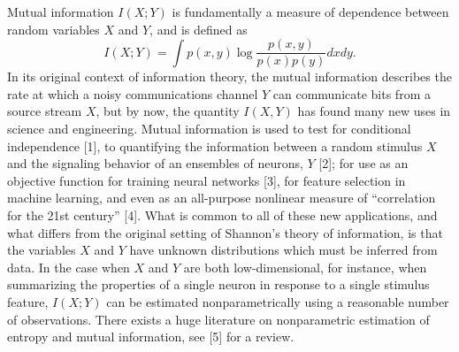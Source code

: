 \documentclass{article}
\begin{document}
Mutual information $I(X; Y)$ is fundamentally a measure of dependence
between random variables $X$ and $Y$, and is defined as
\[
I(X;Y) = \int p(x, y) \log \frac{p(x, y)}{p(x)p(y)}dxdy.
\]
In its original context of information theory, the mutual information
describes the rate at which a noisy communications channel $Y$ can
communicate bits from a source stream $X$, but by now, the quantity
$I(X, Y)$ has found many new uses in science and engineering.  Mutual
information is used to test for conditional independence [1], to
quantifying the information between a random stimulus $X$ and the
signaling behavior of an ensembles of neurons, $Y$ [2]; for
use as an objective function for training neural networks [3], for
feature selection in machine learning, and even as an all-purpose
nonlinear measure of ``correlation for the 21st century'' [4].
What is common to all of these new applications, and what differs from
the original setting of Shannon's theory of information, is that the
variables $X$ and $Y$ have unknown distributions which must be
inferred from data.  In the case when $X$ and $Y$ are both
low-dimensional, for instance, when summarizing the properties of a
single neuron in response to a single stimulus feature, $I(X; Y)$ can
be estimated nonparametrically using a reasonable number of
observations.  There exists a huge literature on nonparametric
estimation of entropy and mutual information, see [5] for a
review.
\end{document}
